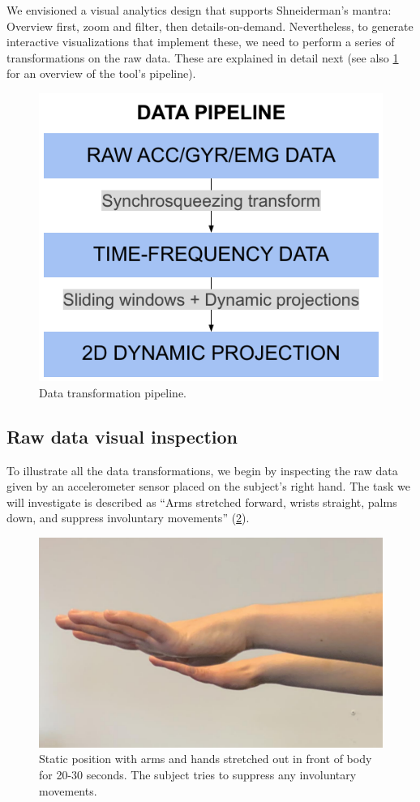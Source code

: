 We envisioned a visual analytics design that supports Shneiderman's mantra: Overview first, zoom and filter, then details-on-demand. Nevertheless, to generate interactive visualizations that implement these, we need to perform a series of transformations on the raw data. These are explained in detail next (see also \cref{fig:nemo-pipe} for an overview of the tool's pipeline).

\begin{figure}[ht]
\centering
\includegraphics[width=.5\linewidth]{figures/nemo/simple-pipeline.pdf}
\caption{Data transformation pipeline.}
\label{fig:nemo-pipe}
\end{figure}

\subsection{Raw data visual inspection}
\label{sec:nemo_pipeline_rawdata}
%
To illustrate all the data transformations, we begin by inspecting the raw data given by an accelerometer sensor placed on the subject's right hand. The task we will investigate is described as ``Arms stretched forward, wrists straight, palms down, and suppress involuntary movements'' (\cref{fig:hands}).

\begin{figure}[ht]
\centering
\includegraphics[width=.5\linewidth]{figures/nemo/hands.png}
\caption{Static position with arms and hands stretched out in front of body for 20-30 seconds. The subject tries to suppress any involuntary movements.}
\label{fig:hands}
\end{figure}

